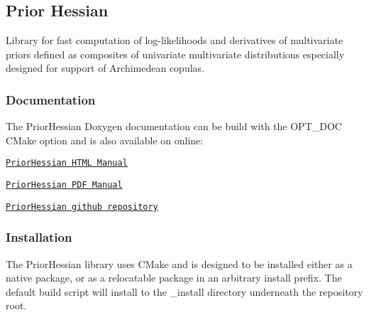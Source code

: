 \href{https://travis-ci.org/markjolah/PriorHessian}{\tt }

\subsection*{Prior Hessian}

Library for fast computation of log-\/likelihoods and derivatives of multivariate priors defined as composites of univariate multivariate distributions especially designed for support of Archimedean copulas.

\subsubsection*{Documentation}

The Prior\+Hessian Doxygen documentation can be build with the {\ttfamily O\+P\+T\+\_\+\+D\+OC} C\+Make option and is also available on online\+:
\begin{DoxyItemize}
\item \href{https://markjolah.github.io/PriorHessian/index.html}{\tt Prior\+Hessian H\+T\+ML Manual}
\item \href{https://markjolah.github.io/PriorHessian/pdf/PriorHessian-0.2.1-reference.pdf}{\tt Prior\+Hessian P\+DF Manual}
\item \href{https://github.com/markjolah/PriorHessian}{\tt Prior\+Hessian github repository}
\end{DoxyItemize}

\subsubsection*{Installation}

The Prior\+Hessian library uses C\+Make and is designed to be installed either as a native package, or as a relocatable package in an arbitrary install prefix. The default build script will install to the {\ttfamily \+\_\+install} directory underneath the repository root.


